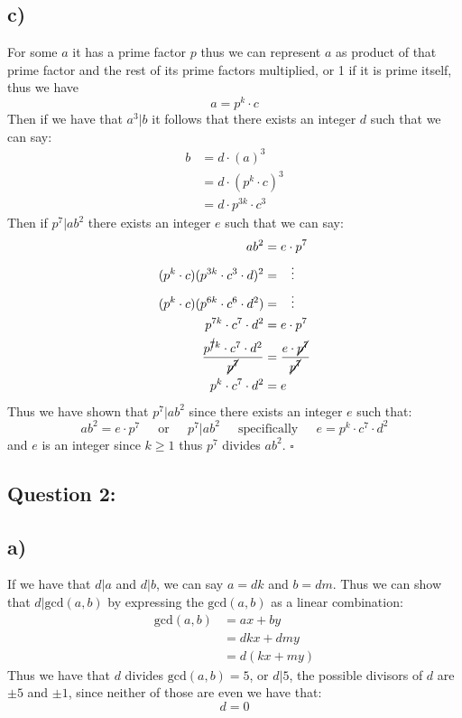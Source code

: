 \documentclass{article}
\begin{document}
\newpage
\subsection*{c)}For some $a$ it has a prime factor $p$ thus we can represent $a$ as product of that prime factor and the rest of its prime factors multiplied, or 1 if it is prime itself, thus we have
$$a=p^{k}\cdot c$$ 
Then if we have that $a^{3}|b$ it follows that there exists an integer $d$ such that we can say: $$\begin{aligned}
    b&=d \cdot (a)^{3}\\
    &= d \cdot (p^{k}\cdot c)^{3}\\
    &= d \cdot  p^{3k}\cdot c^{3}
\end{aligned}$$
Then if $p^{7}|ab^{2}$ there exists an integer $e$ such that we can say: $$\begin{aligned}
    ab^{2}&=e\cdot p^{7}\\
    (p^{k}\cdot c)(p^{3k}\cdot c^{3}\cdot d)^{2}&=\;\;\;\vdots\\
    (p^{k}\cdot c)(p^{6k}\cdot c^{6}\cdot d^{2})&=\;\;\;\vdots\\
    p^{7k}\cdot c^{7}\cdot d^{2}&=e\cdot p^{7}\\
    \frac{p^{\cancel{7}k}\cdot c^{7}\cdot d^{2}}{\cancel{p^{7}}}&=\frac{e\cdot \cancel{p^{7}}}{\cancel{p^{7}}}\\
    p^{k}\cdot c^{7}\cdot d^{2}&=e
\end{aligned}$$
Thus we have shown that $p^{7}|ab^{2}$ since there exists an integer $e$ such that:
$$ab^{2}=e\cdot p^{7}\;\;\;\;\text{ or }\;\;\;\;p^{7}|ab^{2}\;\;\;\;\text{ specifically }\;\;\;\;e=p^{k}\cdot c^{7}\cdot d^{2}$$
and $e$ is an integer since $k\geq 1$ thus $p^{7}$ divides $ab^{2}$. $\square$

\newpage
\subsection*{Question 2:}
\subsection*{a)}
If we have that $d|a$ and $d|b$, we can say $a=dk$ and $b=dm$. Thus we can show that $d|\text{gcd}(a,b)$ by expressing the $\text{gcd}(a,b)$ as a linear combination:
$$\begin{aligned}
    \text{gcd}(a,b)&=ax+by\\
    &=dkx+dmy\\
    &=d(kx+my)
\end{aligned}$$
Thus we have that $d$ divides $\text{gcd}(a,b)=5$, or $d|5$, the possible divisors of $d$ are $\pm 5$ and $\pm 1$, since neither of those are even we have that: $$d=0$$
\end{document}
